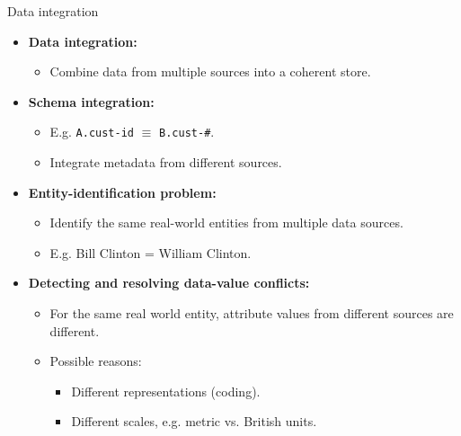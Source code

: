 \documentclass[aspectratio=169,t]{beamer}
\begin{document}
  { 
    \begin{frame}{Data integration}
    \begin{itemize}
       \item \textbf{Data integration:}
       \begin{itemize}
        \item Combine data from multiple sources into a coherent store.
       \end{itemize}
       \item \textbf{Schema integration:}
       \begin{itemize}
        \item E.g. \texttt{A.cust-id} $\equiv$ \texttt{B.cust-\#}.
        \item Integrate metadata from different sources.
       \end{itemize}
       \item \textbf{Entity-identification problem:}
       \begin{itemize}
        \item Identify the same real-world entities from multiple data sources.
        \item E.g. Bill Clinton = William Clinton.
       \end{itemize}
       \item \textbf{Detecting and resolving {\color{airforceblue}data-value conflicts}:}
       \begin{itemize}
        \item For the same real world entity, attribute values from different sources are different.
        \item Possible reasons:
        \begin{itemize}
          \item Different representations (coding).
          \item Different scales, e.g. metric vs. British units.
        \end{itemize}
       \end{itemize}
    \end{itemize}
    \end{frame}
  }
\end{document}
